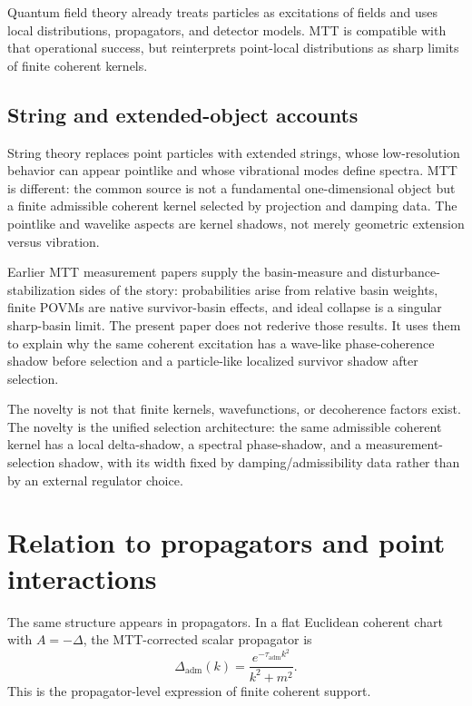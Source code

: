 \documentclass[11pt]{article}
\newcommand{\ta}{\tau_{\mathrm{adm}}}
\begin{document}
Quantum field theory already treats particles as excitations of fields and uses local
distributions, propagators, and detector models. MTT is compatible with that operational
success, but reinterprets point-local distributions as sharp limits of finite coherent kernels.

\subsection{String and extended-object accounts}

String theory \cite{Polchinski} replaces point particles with extended strings, whose low-resolution behavior
can appear pointlike and whose vibrational modes define spectra. MTT is different: the common
source is not a fundamental one-dimensional object but a finite admissible coherent kernel
selected by projection and damping data. The pointlike and wavelike aspects are kernel
shadows, not merely geometric extension versus vibration.

\begin{remark}
Earlier MTT measurement papers supply the basin-measure and disturbance-stabilization
sides of the story: probabilities arise from relative basin weights, finite POVMs are native
survivor-basin effects, and ideal collapse is a singular sharp-basin limit. The present paper
does not rederive those results. It uses them to explain why the same coherent excitation
has a wave-like phase-coherence shadow before selection and a particle-like localized
survivor shadow after selection.
\end{remark}

\begin{remark}
The novelty is not that finite kernels, wavefunctions, or decoherence factors exist. The
novelty is the unified selection architecture: the same admissible coherent kernel has a
local delta-shadow, a spectral phase-shadow, and a measurement-selection shadow, with its
width fixed by damping/admissibility data rather than by an external regulator choice.
\end{remark}

\section{Relation to propagators and point interactions}

The same structure appears in propagators. In a flat Euclidean coherent chart with
\(A=-\Delta\), the MTT-corrected scalar propagator is
\[
  \Delta_{\mathrm{adm}}(k)
  =
  \frac{e^{-\ta k^2}}{k^2+m^2}.
\]
This is the propagator-level expression of finite coherent support.
\end{document}
